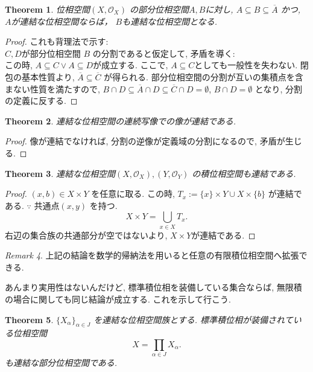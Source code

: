 \documentclass[lualatex]{ltjsbook}
\newcommand{\cl}[1]{\overline{ #1}  }
\newtheorem{theorem}{Theorem}[section]
\theoremstyle{remark}
\newtheorem{remark}[theorem]{Remark}
\theoremstyle{plain}
\begin{document}
\begin{theorem}
	位相空間$\left( X , \mathcal{O}_X \right) $ の部分位相空間$A,B$に対し, $A \subseteq B \subseteq \cl{A} $ かつ, $A$が連結な位相空間ならば， $B$も連結な位相空間となる.
\end{theorem}

\begin{proof}
	これも背理法で示す: \\
	$C,D$が部分位相空間 $B$ の分割であると仮定して, 矛盾を導く:\\
	この時,  $A \subseteq C \lor A \subseteq D$が成立する. 
	ここで, $A \subseteq C$としても一般性を失わない.
	閉包の基本性質より, $\cl{A} \subseteq \cl{C}$ が得られる. 
	部分位相空間の分割が互いの集積点を含まない性質を満たすので, 
	$B \cap D \subseteq \cl{A} \cap D \subseteq \cl{C} \cap D = \emptyset$, 
	$B \cap D = \emptyset$ となり, 分割の定義に反する.
\end{proof}

\begin{theorem}
	連結な位相空間の連続写像での像が連結である.
\end{theorem}

\begin{proof}
	像が連結でなければ, 分割の逆像が定義域の分割になるので, 矛盾が生じる.
\end{proof}

\begin{theorem}
	連結な位相空間$\left( X, \mathcal{O}_X \right) , \left( Y, \mathcal{O}_Y \right) $ の積位相空間も連結である.
\end{theorem}

\begin{proof}
	$(x,b) \in X \times Y $ を任意に取る. この時,
	$T_{x} := \{x\} \times Y \cup X \times \{b\}  $ が連結である. $\because$ 共通点$\left( x,y \right) $ を持つ.\\
	 \[
	X \times Y = \bigcup_{x \in X}T_x 
	.\] 
	右辺の集合族の共通部分が空ではないより, $X \times Y$が連結である.
\end{proof}

\begin{remark}
	上記の結論を数学的帰納法を用いると任意の有限積位相空間へ拡張できる.
\end{remark}

あんまり実用性はないんだけど, 標準積位相を装備している集合ならば, 無限積の場合に関しても同じ結論が成立する. これを示して行こう.

\begin{theorem}
	$\{X_{\alpha}\} _{\alpha \in J}$ を連結な位相空間族とする. 
	標準積位相が装備されている位相空間
	\[
	X = \prod_{\alpha \in J} X _{\alpha}  
	.\] 
	も連結な部分位相空間である.
\end{theorem}
\end{document}
